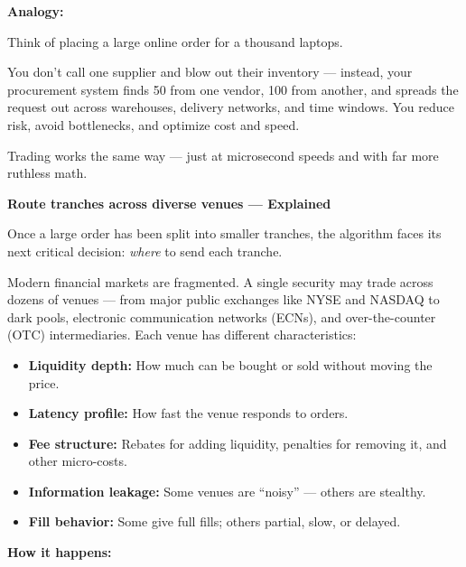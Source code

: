 \textbf{Analogy:}

Think of placing a large online order for a thousand laptops.

You don’t call one supplier and blow out their inventory — instead, your procurement system finds 50 from one vendor, 
100 from another, and spreads the request out across warehouses, delivery networks, and time windows. You reduce risk, 
avoid bottlenecks, and optimize cost and speed.

Trading works the same way — just at microsecond speeds and with far more ruthless math.


\textbf{Route tranches across diverse venues — Explained}

Once a large order has been split into smaller tranches, the algorithm faces its next critical decision: \textit{where} 
to send each tranche.

Modern financial markets are fragmented. A single security may trade across dozens of venues — from major public exchanges 
like NYSE and NASDAQ to dark pools, electronic communication networks (ECNs), and over-the-counter (OTC) intermediaries. 
Each venue has different characteristics:

\begin{itemize}
  \item \textbf{Liquidity depth:} How much can be bought or sold without moving the price.
  \item \textbf{Latency profile:} How fast the venue responds to orders.
  \item \textbf{Fee structure:} Rebates for adding liquidity, penalties for removing it, and other micro-costs.
  \item \textbf{Information leakage:} Some venues are “noisy” — others are stealthy.
  \item \textbf{Fill behavior:} Some give full fills; others partial, slow, or delayed.
\end{itemize}

\textbf{How it happens:}

